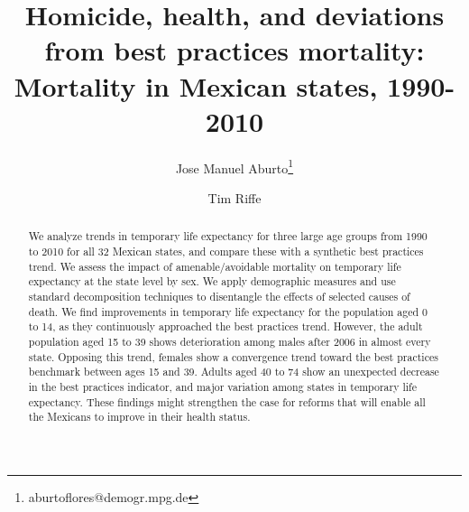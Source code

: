 \documentclass{article}
\title{Homicide, health, and deviations from best practices mortality: Mortality in Mexican states, 1990-2010}
\author[1]{Jose Manuel Aburto\thanks{aburtoflores@demogr.mpg.de}}
\author[2]{Tim Riffe}
\affil[1]{Max Planck Institute for Demographic Research, EDSD}
\affil[2]{Max Planck Institute for Demographic Research}
\begin{document}
\maketitle

\begin{abstract}
We analyze trends in temporary life expectancy for three large age groups from 1990 to 2010 for all 32 Mexican states, and compare these with a synthetic best practices trend. We assess the impact of amenable/avoidable mortality on temporary life expectancy at the state level by sex. We apply demographic measures and use standard decomposition techniques to disentangle the effects of selected causes of death. We find improvements in temporary life expectancy for the population aged 0 to 14, as they continuously approached the best practices trend. However, the adult population aged 15 to 39 shows deterioration among males after 2006 in almost every state. Opposing this trend, females show a convergence trend toward the best practices benchmark between ages 15 and 39. Adults aged 40 to 74 show an unexpected decrease in the best practices indicator, and major variation among states in temporary life expectancy. These findings might strengthen the case for reforms that will enable all the Mexicans to improve in their health status.
​



\end{abstract}
\end{document}
